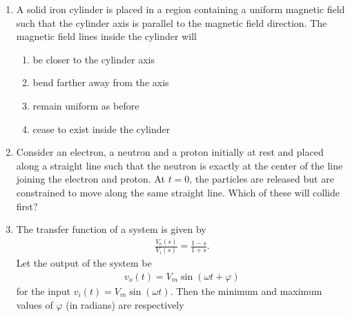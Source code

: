 \documentclass[journal,12pt,onecolumn]{IEEEtran}
\theoremstyle{remark}
\begin{document}
\begin{enumerate}
\begin{enumerate}
\end{enumerate}

\item A solid iron cylinder is placed in a region containing a uniform magnetic field such that the cylinder axis is parallel to the magnetic field direction. The magnetic field lines inside the cylinder will  

\begin{enumerate}
\item be closer to the cylinder axis  
\item bend farther away from the axis  
\item remain uniform as before  
\item cease to exist inside the cylinder  
\end{enumerate}

\item Consider an electron, a neutron and a proton initially at rest and placed along a straight line such that the neutron is exactly at the center of the line joining the electron and proton. At $t=0$, the particles are released but are constrained to move along the same straight line. Which of these will collide first?

\begin{enumerate}
\end{enumerate}

\item The transfer function of a system is given by
\begin{align*}
    \frac{V_o(s)}{V_i(s)} = \frac{1-s}{1+s}.
\end{align*}
Let the output of the system be \begin{align*}
    v_o(t) = V_m \sin(\omega t + \varphi)
\end{align*}
for the input $v_i(t) = V_m \sin(\omega t)$.  
Then the minimum and maximum values of $\varphi$ (in radians) are respectively


\end{enumerate}
\end{document}
